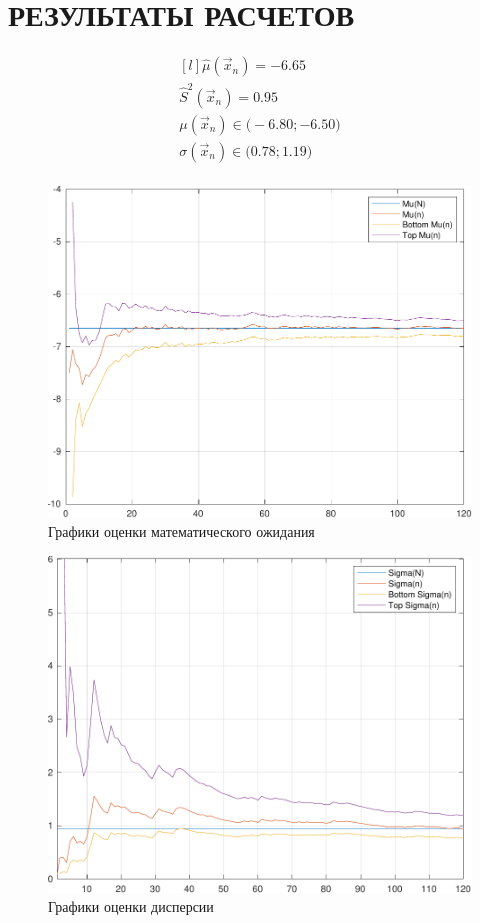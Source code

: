 \section{РЕЗУЛЬТАТЫ РАСЧЕТОВ}

\begin{equation*}
    \begin{matrix*}[l]
        \hat \mu (\vec x_n) = -6.65 \\
        \hat S^2 (\vec x_n) = 0.95 \\
        \mu (\vec x_n) \in \big( -6.80; -6.50 \big) \\
        \sigma (\vec x_n) \in \big( 0.78; 1.19 \big) \\
    \end{matrix*}
\end{equation*}

\begin{figure}[H]
    \centering
    \includegraphics[scale=1]{img/mu.pdf}
    \caption{Графики оценки математического ожидания}
\end{figure}

\begin{figure}[H]
    \centering
    \includegraphics[scale=1]{img/sigma.pdf}
    \caption{Графики оценки дисперсии}
\end{figure}
